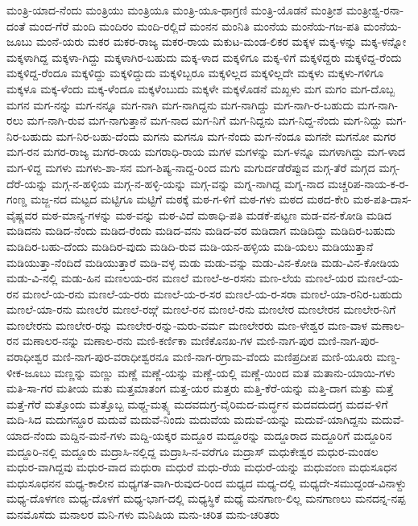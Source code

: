 {ಮಂತ್ರಿ-ಯಾದ-ನೆಂದು
ಮಂತ್ರಿಯು
ಮಂತ್ರಿಯೂ
ಮಂತ್ರಿ-ಯೂ-ಥಾಗ್ರಣಿ
ಮಂತ್ರಿ-ಯೊಡನೆ
ಮಂತ್ರೀಶ
ಮಂತ್ರೀಶ್ವ-ರನಾ-ದಂತೆ
ಮಂದ-ಗೆರೆ
ಮಂದಿ
ಮಂದಿರಂ
ಮಂದಿ-ರಲ್ಲಿದೆ
ಮಂನನ
ಮಂನಿತಿ
ಮಂನೆಯ
ಮಂನೆಯ-ಗಜ-ಪತಿ
ಮಂನೆಯ-ಜೂಬು
ಮಂನೆ-ಯರು
ಮಕರ
ಮಕರ-ರಾಜ್ಯ
ಮಕರ-ರಾಯ
ಮಕುಟ-ಮಂಡ-ಲಿಕರ
ಮಕ್ಕಳ
ಮಕ್ಕ-ಳನ್ನು
ಮಕ್ಕ-ಳನ್ನೋ
ಮಕ್ಕಳಾಗಿದ್ದ
ಮಕ್ಕಳಾ-ಗಿದ್ದು
ಮಕ್ಕಳಾಗಿರ-ಬಹುದು
ಮಕ್ಕ-ಳಾದ
ಮಕ್ಕಳಿಗೂ
ಮಕ್ಕ-ಳಿಗೆ
ಮಕ್ಕಳಿದ್ದರು
ಮಕ್ಕಳಿದ್ದ-ರೆಂದು
ಮಕ್ಕಳಿದ್ದ-ರೆಂದೂ
ಮಕ್ಕಳಿದ್ದು
ಮಕ್ಕಳಿದ್ದುದು
ಮಕ್ಕಳಿಬ್ಬರೂ
ಮಕ್ಕಳಿಲ್ಲದ
ಮಕ್ಕಳಿಲ್ಲದೇ
ಮಕ್ಕಳು
ಮಕ್ಕಳು-ಗಳಿಗೂ
ಮಕ್ಕಳೂ
ಮಕ್ಕ-ಳೆಂದು
ಮಕ್ಕ-ಳೆಂದೂ
ಮಕ್ಕಳೆಂಬುದು
ಮಕ್ಕಳೇ
ಮಕ್ಕಳೊಡನೆ
ಮಖ್ಖಳು
ಮಗ
ಮಗಂ
ಮಗ-ದೊಬ್ಬ
ಮಗನ
ಮಗ-ನನ್ನು
ಮಗ-ನನ್ನೂ
ಮಗ-ನಾಗಿ
ಮಗ-ನಾಗಿದ್ದನು
ಮಗ-ನಾಗಿದ್ದು
ಮಗ-ನಾಗಿ-ರ-ಬಹುದು
ಮಗ-ನಾಗಿ-ರಲು
ಮಗ-ನಾಗಿ-ರುವ
ಮಗ-ನಾಗುತ್ತಾನೆ
ಮಗ-ನಾದ
ಮಗ-ನಿಗೆ
ಮಗ-ನಿದ್ದನು
ಮಗ-ನಿದ್ದ-ನೆಂದು
ಮಗ-ನಿದ್ದು
ಮಗ-ನಿರ-ಬಹುದು
ಮಗ-ನಿರ-ಬಹು-ದೆಂದು
ಮಗನು
ಮಗನೂ
ಮಗ-ನೆಂದು
ಮಗ-ನೆಂದೂ
ಮಗನೇ
ಮಗನೋ
ಮಗರ
ಮಗ-ರನ
ಮಗರ-ರಾಜ್ಯ
ಮಗರ-ರಾಯ
ಮಗರಾಧಿ-ರಾಯ
ಮಗಳ
ಮಗಳನ್ನು
ಮಗ-ಳನ್ನೂ
ಮಗಳಾಗಿದ್ದು
ಮಗ-ಳಾದ
ಮಗ-ಳಿದ್ದ
ಮಗಳು
ಮಗಳು-ಶಾ-ಸನ
ಮಗ-ಶಿಷ್ಯ-ನಾದ್ದ-ರಿಂದ
ಮಗು
ಮಗುರ್ದಡೆರೆಪ್ಪುವ
ಮಗ್ಗ-ತೆರೆ
ಮಗ್ಗದ
ಮಗ್ಗ-ದೆರೆ-ಯನ್ನು
ಮಗ್ಗ-ನ-ಹಳ್ಳಿಯ
ಮಗ್ಗ-ನ-ಹಳ್ಳಿ-ಯನ್ನು
ಮಗ್ಗ-ವನ್ನು
ಮಗ್ನ-ನಾಗಿದ್ದ
ಮಗ್ನ-ನಾದ
ಮಚ್ಚರಿಪ-ನಾಯ-ಕ-ರ-ಗಂಣ್ಡ
ಮಜ್ಜ-ನದ
ಮಟ್ಟದ
ಮಟ್ಟಿಗೂ
ಮಟ್ಟಿಗೆ
ಮಠಕ್ಕೆ
ಮಠ-ಗ-ಳಿಗೆ
ಮಠ-ಗಳು
ಮಠದ
ಮಠದ-ಕೇರಿ
ಮಠ-ಪತಿ-ದಾಸ-ವೈಷ್ಣವರ
ಮಠ-ಮಾನ್ಯ-ಗಳನ್ನು
ಮಠ-ವನ್ನು
ಮಠ-ವಿದೆ
ಮಠಾಧಿ-ಪತಿ
ಮಡಕೆ-ಪಟ್ಟಣ
ಮಡ-ವನ-ಕೋಡಿ
ಮಡಿದ
ಮಡಿದನು
ಮಡಿದ-ನೆಂದು
ಮಡಿದ-ರೆಂದು
ಮಡಿದ-ವನು
ಮಡಿದ-ವರ
ಮಡಿದಾಗ
ಮಡಿದಿದ್ದು
ಮಡಿದಿರ-ಬಹುದು
ಮಡಿದಿರ-ಬಹು-ದೆಂದು
ಮಡಿದಿರ-ವುದು
ಮಡಿದಿ-ರುವ
ಮಡಿ-ಯನ-ಹಳ್ಳಿಯ
ಮಡಿ-ಯಲು
ಮಡಿಯುತ್ತಾನೆ
ಮಡಿಯುತ್ತಾ-ನೆಂದಿದೆ
ಮಡಿಯುತ್ತಾರೆ
ಮಡಿ-ವಳ್ಳ
ಮಡು
ಮಡು-ವನ್ನು
ಮಡು-ವಿನ-ಕೋಡಿ
ಮಡು-ವಿನ-ಕೋಡಿಯ
ಮಡು-ವಿ-ನಲ್ಲಿ
ಮಡು-ಹಿನ
ಮಣಲಯ-ರನ
ಮಣಲೆ
ಮಣಲೆ-ಅ-ರಸನು
ಮಣ-ಲೆಯ
ಮಣಲೆ-ಯರ
ಮಣಲೆ-ಯ-ರನ
ಮಣಲೆ-ಯ-ರನು
ಮಣಲೆ-ಯ-ರರು
ಮಣಲೆ-ಯ-ರ-ಸರ
ಮಣಲೆ-ಯ-ರ-ಸರಾ
ಮಣಲೆ-ಯಾ-ರನಿರ-ಬಹುದು
ಮಣಲೆ-ಯಾ-ರನು
ಮಣಲೆರ
ಮಣಲೆ-ರಙ್ಗೆ
ಮಣಲೆ-ರನ
ಮಣಲೆ-ರನು
ಮಣಲೇರ
ಮಣಲೇರನ
ಮಣಲೇರ-ನಿಗೆ
ಮಣಲೇರನು
ಮಣಲೇರ-ರನ್ನು
ಮಣಲೇರ-ರನ್ನು-ಮರು-ವರ್ಮ
ಮಣಲೇರರು
ಮಣ-ಳೇಶ್ವರ
ಮಣ-ವಾಳ
ಮಣಾಲ-ರನ
ಮಣಾಲರ-ನನ್ನು
ಮಣಾಲ-ರನು
ಮಣಿ-ಕರ್ಣಿಕಾ
ಮಣಿಕೊನಖ-ಗಳ
ಮಣಿ-ನಾಗ-ಪುರ
ಮಣಿ-ನಾಗ-ಪುರ-ವರಾಧೀಶ್ವರ
ಮಣಿ-ನಾಗ-ಪುರ-ವರಾಧೀಶ್ವರನೂ
ಮಣಿ-ನಾಗ-ರಗ್ರಾಮ-ವೆಂದು
ಮಣಿಪ್ರದೀಪ
ಮಣಿ-ಯೂರು
ಮಣ್ಡ-ಳೀಕ-ಜೂಬು
ಮಣ್ಣನ್ನು
ಮಣ್ಣು
ಮಣ್ಣೆ
ಮಣ್ಣೆ-ಯನ್ನು
ಮಣ್ಣೆ-ಯಲ್ಲಿ
ಮಣ್ಣೆ-ಯಿಂದ
ಮತ
ಮತಾನು-ಯಾಯಿ-ಗಳು
ಮತಿ-ಸಾ-ಗರ
ಮತೀಯ
ಮತು
ಮತ್ತಮಾತಂಗ
ಮತ್ತ-ಯರ
ಮತ್ತರು
ಮತ್ತಿ-ಕೆರೆ-ಯನ್ನು
ಮತ್ತಿ-ದಾಗ
ಮತ್ತು
ಮತ್ತೆ
ಮತ್ತೆ-ಗೆರೆ
ಮತ್ತೊಂದು
ಮತ್ತೊಬ್ಬ
ಮಥ್ಚ-ಮತ್ಸ್ಯ
ಮದವದುಗ್ರ-ವೈರಿಮದ-ಮರ್ದ್ಧನ
ಮದವದುದಗ್ರ
ಮದವ-ಳಿಗೆ
ಮದಿ-ಸಿದ
ಮದುಗನ್ದೂರ
ಮದುವೆ
ಮದುವೆ-ನಿಂದು
ಮದುವೆಯ
ಮದುವೆ-ಯನ್ನು
ಮದುವೆ-ಯಾಗಿದ್ದನು
ಮದುವೆ-ಯಾದ-ನೆಂದು
ಮದ್ದಿನ-ಮನೆ-ಗಳು
ಮದ್ದಿ-ಯಕ್ಕರ
ಮದ್ದೂರ
ಮದ್ದೂರನ್ನು
ಮದ್ದೂರಾದ
ಮದ್ದೂರಿಗೆ
ಮದ್ದೂರಿನ
ಮದ್ದೂರಿ-ನಲ್ಲಿ
ಮದ್ದೂರು
ಮದ್ರಾಸಿ-ನಲ್ಲಿದ್ದ
ಮದ್ರಾಸಿ-ನ-ವರೆಗೂ
ಮದ್ರಾಸ್
ಮಧುಕೇಶ್ವರ
ಮಧುರ-ಮಂಡಲ
ಮಧುರ-ವಾಗಿದ್ದವು
ಮಧುರ-ವಾದ
ಮಧುರಾ
ಮಧುರೆ
ಮಧು-ರೆಯ
ಮಧುರೆ-ಯನ್ನು
ಮಧುವಂಣ
ಮಧುಸೂಧನ
ಮಧುಸೂಧನನ
ಮಧ್ಯ-ಕಾಲೀನ
ಮಧ್ಯಗತ-ವಾಗಿ-ರುವುದ-ರಿಂದ
ಮಧ್ಯದ
ಮಧ್ಯ-ದಲ್ಲಿ
ಮಧ್ಯದೇ-ಸಮುದ್ದಂಡ-ವಿನಾಳ್ದು
ಮಧ್ಯ-ದೊಳಗಣ
ಮಧ್ಯ-ದೊಳಗೆ
ಮಧ್ಯ-ಭಾಗ-ದಲ್ಲಿ
ಮಧ್ಯಸ್ಥಿಕೆ
ಮಧ್ಯೆ
ಮನಗಾಣ-ಲಿಲ್ಲ
ಮನಗಾಣಲು
ಮನದನ್ನ-ನಪ್ಪ
ಮನಮೊಸೆದು
ಮನಾಲರ
ಮನಿ-ಗಳು
ಮನಿಷಿಯ
ಮನು-ಚರಿತ
ಮನು-ಚರಿತರು
}
